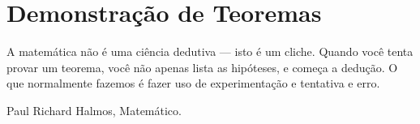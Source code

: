 \chapter{Demonstração de Teoremas}\label{cap4}

\epigraph{A matemática não é uma ciência dedutiva --- isto é um
  cliche. Quando você tenta provar um teorema, você não apenas lista
  as hipóteses, e começa a dedução. O que normalmente fazemos é fazer
  uso de experimentação e tentativa e erro.}{Paul Richard Halmos,
  Matemático.}
